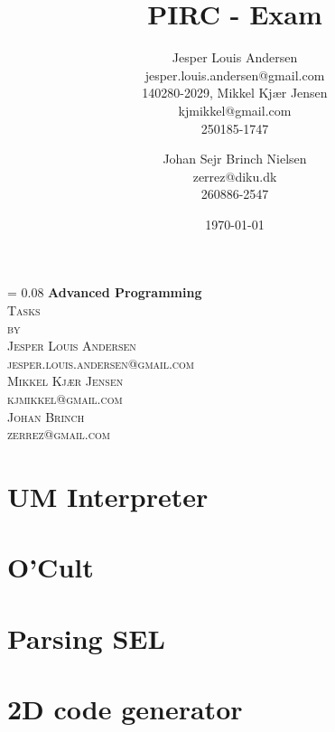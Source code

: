\documentclass[a4paper, oneside, 10pt, draft]{memoir}
\author{Jesper Louis
  Andersen\\jesper.louis.andersen@gmail.com\\140280-2029,
  Mikkel Kj\ae r Jensen \\ kjmikkel@gmail.com\\250185-1747 \and
  Johan Sejr Brinch Nielsen \\ zerrez@diku.dk \\ 260886-2547
}
\title{PIRC - Exam}
\date{\today}
\makeatletter
\renewcommand*{\titleM}{\begingroup%
  \drop = 0.08\textheight
  \centering
  {\Huge\bfseries Advanced Programming}\\[\baselineskip]
  {\scshape Tasks}\\[\baselineskip]
  {\scshape by}\\[\baselineskip]
  {\large\scshape Jesper Louis Andersen\\jesper.louis.andersen@gmail.com}\\[\baselineskip]
  {\large\scshape Mikkel Kj\ae r Jensen\\kjmikkel@gmail.com}\\[\baselineskip]
  {\large\scshape Johan Brinch\\zerrez@gmail.com}\\[\baselineskip]
  \endgroup}
\newcommand{\hide}[1]{}
\makeatother
\begin{document}
\titleM
\listoffixmes
\tableofcontents

\chapter{UM Interpreter}
\label{chap:task+1}

\chapter{O'Cult}
\label{chap:ocult}

\chapter{Parsing SEL}


\chapter*{2D code generator}
\label{compiler}








\appendix
\hide{
\clearpage
\section{Source}

\clearpage

\clearpage

\clearpage

\clearpage

\clearpage
\section{Twelf}
\label{appendix:twelf}

\clearpage

\clearpage

}
\end{document}
